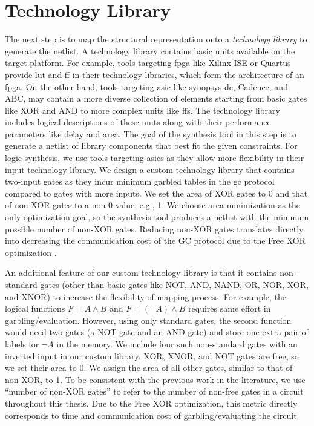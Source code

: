 \section{Technology Library}\label{sec:syn-techlib}
The next step is to map the structural representation onto a \emph{technology library} to generate the \gls{netlist}.
A technology library contains basic units available on the target platform.
For example, tools targeting \acrfull{fpga} like Xilinx ISE or Quartus provide \acrfull{lut} and \acrfull{ff} in their technology libraries, which form the architecture of an \acrshort{fpga}.
On the other hand, tools targeting \acrfull{asic} like \gls{synopsys-dc}, Cadence, and ABC, may contain a more diverse collection of elements starting from basic gates like XOR and AND to more complex units like \acrshort{ff}s.
The technology library includes logical descriptions of these units along with their performance parameters like delay and area.
The goal of the synthesis tool in this step is to generate a \gls{netlist} of library components that best fit the given constraints.
For logic synthesis, we use tools targeting \acrshort{asic}s as they allow more flexibility in their input technology library.
We design a custom technology library that contains two-input gates as they incur minimum garbled tables in the \acrshort{gc} protocol compared to gates with more inputs.
We set the area of XOR gates to 0 and that of non-XOR gates to a non-0 value, e.g., 1.
We choose area minimization as the only optimization goal, so the synthesis tool produces a \gls{netlist} with the minimum possible number of non-XOR gates.
Reducing non-XOR gates translates directly into decreasing the communication cost of the GC protocol due to the Free XOR optimization \cite{kolesnikov2008improved}.

An additional feature of our custom technology library is that it contains non-standard gates (other than basic gates like NOT, AND, NAND, OR, NOR, XOR, and XNOR) to increase the flexibility of mapping process.
For example, the logical functions $F = A\wedge B$ and $F = (\neg A)\wedge B$ requires same effort in garbling/evaluation.
However, using only standard gates, the second function would need two gates (a NOT gate and an AND gate) and store one extra pair of labels for $\neg A$ in the memory.
We include four such non-standard gates with an inverted input in our custom library.
XOR, XNOR, and NOT gates are free, so we set their area to 0.
We assign the area of all other gates, similar to that of non-XOR, to 1.
To be consistent with the previous work in the literature, we use ``number of non-XOR gates'' to refer to the number of non-free gates in a circuit throughout this thesis.
Due to the Free XOR optimization, this metric directly corresponds to time and communication cost of garbling/evaluating the circuit.


